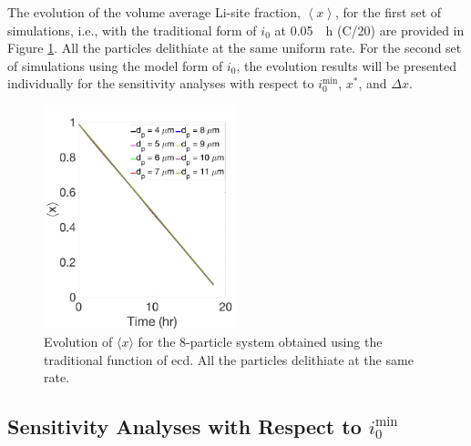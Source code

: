 \documentclass{article}
\begin{document}
The evolution of the volume average Li-site fraction, $\left\langle
x\right\rangle $, for the first set of simulations, i.e., with the
traditional form of $i_0$ at \SI{0.05}{\per\hour} (C/20) are provided
in Figure \ref{fig:x-evolution}. All the particles delithiate at the
same uniform rate. For the second set of simulations using the model
form of $i_0$, the evolution results will be presented individually
for the sensitivity analyses with respect to $i_0^{\mathrm{min}}$,
$x^{\ast}$, and $\Delta x$.

\begin{figure}
  \begin{center}
    \includegraphics[width=0.5\textwidth]{8-particle-evolution.pdf}
  \end{center}
  \caption{Evolution of $\langle x \rangle$ for the 8-particle system
    obtained using the traditional function of \gls{ecd}. All the
    particles delithiate at the same rate.}
  \label{fig:x-evolution}
\end{figure}

\subsection{Sensitivity Analyses with Respect to $i_0^{\mathrm{min}}$}
\end{document}
